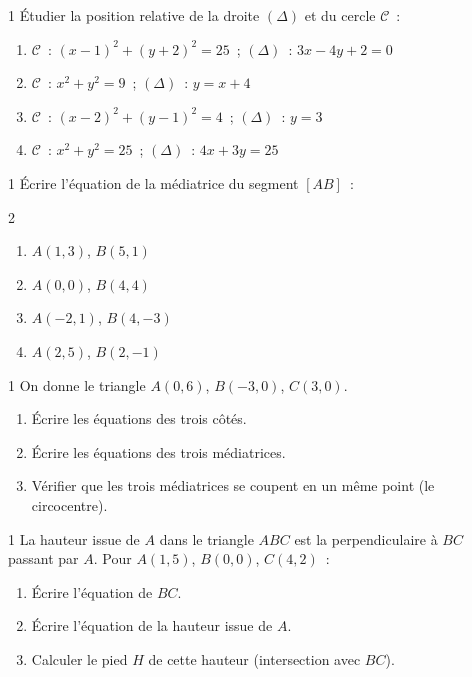 \begin{exo}{1}
\'Etudier la position relative de la droite $(\Delta)$ et du cercle $\mathcal{C}$~:
\begin{enumerate}
  \item $\mathcal{C}$~: $(x-1)^2+(y+2)^2=25$~; $(\Delta)$~: $3x-4y+2=0$
  \item $\mathcal{C}$~: $x^2+y^2=9$~; $(\Delta)$~: $y=x+4$
  \item $\mathcal{C}$~: $(x-2)^2+(y-1)^2=4$~; $(\Delta)$~: $y=3$
  \item $\mathcal{C}$~: $x^2+y^2=25$~; $(\Delta)$~: $4x+3y=25$
\end{enumerate}
\end{exo}

\begin{exo}{1}
\'Ecrire l'\'equation de la m\'ediatrice du segment $[AB]$~:
\begin{multicols}{2}
\begin{enumerate}
  \item $A(1,3)$, $B(5,1)$
  \item $A(0,0)$, $B(4,4)$
  \item $A(-2,1)$, $B(4,-3)$
  \item $A(2,5)$, $B(2,-1)$
\end{enumerate}
\end{multicols}
\end{exo}

\begin{exo}{1}
On donne le triangle $A(0,6)$, $B(-3,0)$, $C(3,0)$.
\begin{enumerate}
  \item \'Ecrire les \'equations des trois c\^ot\'es.
  \item \'Ecrire les \'equations des trois m\'ediatrices.
  \item V\'erifier que les trois m\'ediatrices se coupent en un m\^eme point
        (le circocentre).
\end{enumerate}
\end{exo}

\begin{exo}{1}
La hauteur issue de $A$ dans le triangle $ABC$ est la perpendiculaire
\`a $BC$ passant par $A$.
Pour $A(1,5)$, $B(0,0)$, $C(4,2)$~:
\begin{enumerate}
  \item \'Ecrire l'\'equation de $BC$.
  \item \'Ecrire l'\'equation de la hauteur issue de $A$.
  \item Calculer le pied $H$ de cette hauteur (intersection avec $BC$).
\end{enumerate}
\end{exo}

